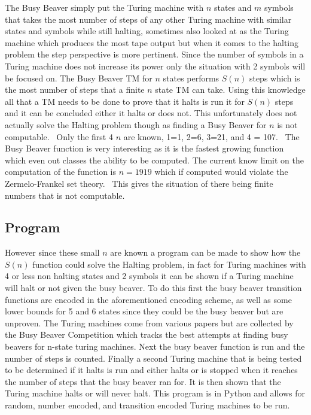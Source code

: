 \documentclass[journal,12pt,onecolumn,draftclsnofoot,]{IEEEtran}
\begin{document}
The Busy Beaver simply put the Turing machine with $n$ states and $m$ symbols that takes the 
most number of steps of any other Turing machine with similar states and symbols while still 
halting, sometimes also looked at as the Turing machine
which produces the most tape output but when it comes to the halting problem the step
perspective is more pertinent. Since the number of symbols in a Turing machine does not
increase its power only the situation with 2 symbols will be focused on. The Busy Beaver
TM for $n$ states performs $S(n)$ steps which is the most number of steps that a finite $n$ 
state TM can take. Using this knowledge all that a TM needs to be done to prove that it
halts is run it for $S(n)$ steps and it can be concluded either it halts or does not.
This unfortunately does not actually solve the Halting problem though as finding a 
Busy Beaver for $n$ is not computable.~\cite{rado} Only the first 4 $n$ are known, 1=1,
2=6, 3=21,
and 4 = 107.~\cite{oeis} The Busy Beaver function is very interesting as it is the fastest
growing function which even out classes the ability to be computed. The current know limit on
the computation of the function is $n=1919$ which if computed would violate the 
Zermelo-Frankel set theory.~\cite{8000}\cite{1919} This gives the situation of there being finite numbers 
that is not computable.

\subsection{Program}

However since these small $n$ are known a program can be made to show how the $S(n)$ function
could solve the Halting problem, in fact for Turing machines with 4 or less non halting states
and 2 symbols it can be shown if a Turing machine will halt or not given the busy beaver. 
To do this first the busy beaver transition functions are encoded in the aforementioned 
encoding scheme, as well as some lower bounds for 5 and 6 states since they could be 
the busy beaver but are unproven. The Turing machines come from various papers but are 
collected by the Busy Beaver Competition which tracks the best attempts at finding busy
beavers for n-state turing machines.\cite{comp}
Next the busy beaver function is run and the number of steps
is counted. Finally a second Turing machine that is being tested to be determined if it halts
is run and either halts or is stopped when it reaches the number of steps that the busy beaver
ran for. It is then shown that the Turing machine halts or will never halt. This program is
in Python and allows for random, number encoded, and transition encoded Turing machines
to be run.~\cite{halting-prog}
\end{document}
